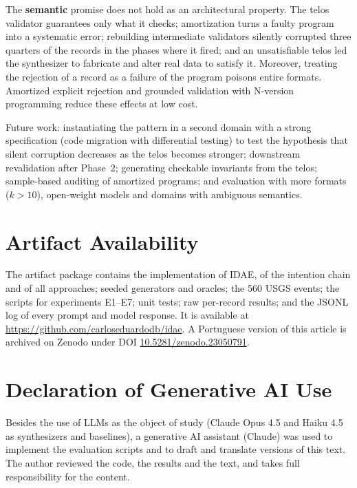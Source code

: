 \documentclass[sigconf,nonacm]{acmart}
\begin{document}
The \textbf{semantic} promise does not hold as an architectural property. The telos validator guarantees only what it checks; amortization turns a faulty program into a systematic error; rebuilding intermediate validators silently corrupted three quarters of the records in the phases where it fired; and an unsatisfiable telos led the synthesizer to fabricate and alter real data to satisfy it. Moreover, treating the rejection of a record as a failure of the program poisons entire formats. Amortized explicit rejection and grounded validation with N-version programming reduce these effects at low cost.

Future work: instantiating the pattern in a second domain with a strong specification (code migration with differential testing) to test the hypothesis that silent corruption decreases as the telos becomes stronger; downstream revalidation after Phase~2; generating checkable invariants from the telos; sample-based auditing of amortized programs; and evaluation with more formats ($k > 10$), open-weight models and domains with ambiguous semantics.

\section*{Artifact Availability}

The artifact package contains the implementation of IDAE, of the intention chain and of all approaches; seeded generators and oracles; the 560 USGS events; the scripts for experiments E1--E7; unit tests; raw per-record results; and the JSONL log of every prompt and model response. It is available at \url{https://github.com/carloseduardodb/idae}. A Portuguese version of this article is archived on Zenodo under DOI \href{https://doi.org/10.5281/zenodo.23050791}{10.5281/zenodo.23050791}.

\section*{Declaration of Generative AI Use}

Besides the use of LLMs as the object of study (Claude Opus 4.5 and Haiku 4.5 as synthesizers and baselines), a generative AI assistant (Claude) was used to implement the evaluation scripts and to draft and translate versions of this text. The author reviewed the code, the results and the text, and takes full responsibility for the content.
\end{document}
